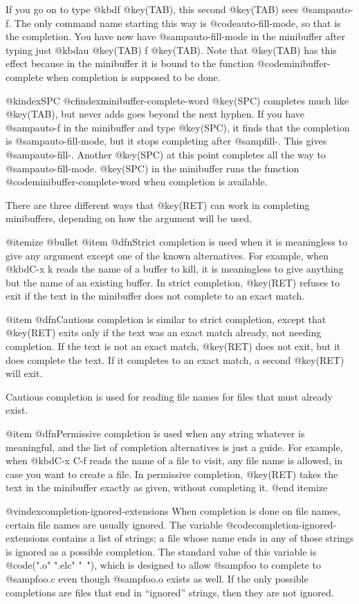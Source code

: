 {{{{  If you go on to type @kbd{f @key(TAB)}, this second @key(TAB) sees
@samp{auto-f}.  The only command name starting this way is
@code{auto-fill-mode}, so that is the completion.  You have now have
@samp{auto-fill-mode} in the minibuffer after typing just @kbd{au @key(TAB)
f @key(TAB)}.  Note that @key(TAB) has this effect because in the
minibuffer it is bound to the function @code{minibuffer-complete} when
completion is supposed to be done.

@kindex{SPC}
@cfindex{minibuffer-complete-word}
  @key(SPC) completes much like @key(TAB), but never adds goes beyond the
next hyphen.  If you have @samp{auto-f} in the minibuffer and type
@key(SPC), it finds that the completion is @samp{auto-fill-mode}, but it
stops completing after @samp{fill-}.  This gives @samp{auto-fill-}.
Another @key(SPC) at this point completes all the way to
@samp{auto-fill-mode}.  @key(SPC) in the minibuffer runs the function
@code{minibuffer-complete-word} when completion is available.

  There are three different ways that @key(RET) can work in completing
minibuffers, depending on how the argument will be used.

@itemize @bullet
@item
@dfn{Strict} completion is used when it is meaningless to give any
argument except one of the known alternatives.  For example, when
@kbd{C-x k} reads the name of a buffer to kill, it is meaningless to
give anything but the name of an existing buffer.  In strict
completion, @key(RET) refuses to exit if the text in the minibuffer
does not complete to an exact match.

@item
@dfn{Cautious} completion is similar to strict completion, except
that @key(RET) exits only if the text was an exact match already,
not needing completion.  If the text is not an exact match, @key(RET)
does not exit, but it does complete the text.  If it completes to an exact
match, a second @key(RET) will exit.

Cautious completion is used for reading file names for files that
must already exist.

@item
@dfn{Permissive} completion is used when any string whatever is
meaningful, and the list of completion alternatives is just a guide.
For example, when @kbd{C-x C-f} reads the name of a file to visit, any
file name is allowed, in case you want to create a file.  In permissive
completion, @key(RET) takes the text in the minibuffer exactly as
given, without completing it.
@end itemize

@vindex{completion-ignored-extensions}
  When completion is done on file names, certain file names are usually
ignored.  The variable @code{completion-ignored-extensions} contains a
list of strings; a file whose name ends in any of those strings is ignored
as a possible completion.  The standard value of this variable is
@code{(".o" ".elc" "~")}, which is designed to allow @samp{foo} to
complete to @samp{foo.c} even though @samp{foo.o} exists as well.
If the only possible completions are files that end in ``ignored''
strings, then they are not ignored.

}}}}
